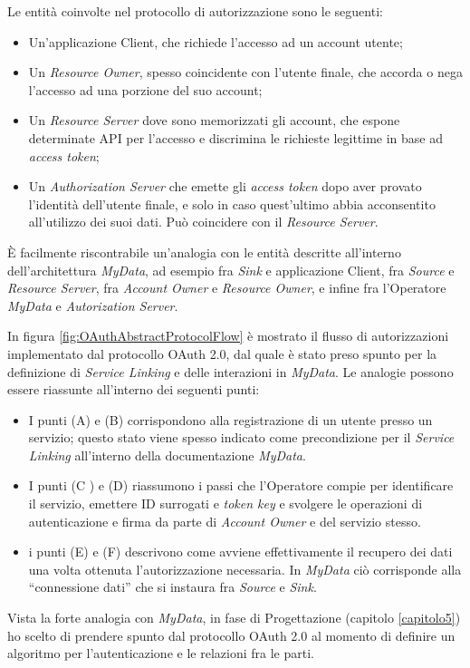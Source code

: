 Le entit\`a coinvolte nel protocollo di autorizzazione sono le seguenti:
\begin{itemize}
	\item Un’applicazione Client, che richiede l’accesso ad un account utente;
	\item Un \textit{Resource Owner}, spesso coincidente con l’utente finale, che accorda o nega l’accesso ad una porzione del suo account;
	\item Un \textit{Resource Server} dove sono memorizzati gli account, che espone determinate API per l’accesso e discrimina le richieste legittime in base ad \textit{access token};
	\item Un \textit{Authorization Server} che emette gli \textit{access token} dopo aver provato l’identit\`a dell’utente finale, e solo in caso quest’ultimo abbia acconsentito all’utilizzo dei suoi dati. Pu\`o coincidere con il \textit{Resource Server}.
\end{itemize}
\`E facilmente riscontrabile un’analogia con le entit\`a descritte all’interno dell’architettura \textit{MyData}, ad esempio fra \textit{Sink} e applicazione Client, fra \textit{Source} e \textit{Resource Server}, fra \textit{Account Owner} e \textit{Resource Owner}, e infine fra l’Operatore \textit{MyData} e \textit{Autorization Server}.

In figura \ref{fig:OAuthAbstractProtocolFlow} \`e mostrato il flusso di autorizzazioni implementato dal protocollo OAuth 2.0, dal quale \`e stato preso spunto per la definizione di \textit{Service Linking} e delle interazioni in \textit{MyData}. Le analogie possono essere riassunte all’interno dei seguenti punti:
\begin{itemize}
	\item I punti (A) e (B) corrispondono alla registrazione di un utente presso un servizio; questo stato viene spesso indicato come precondizione per il \textit{Service Linking} all’interno della documentazione \textit{MyData}.
	\item I punti (C ) e (D) riassumono i passi che l’Operatore compie per identificare il servizio, emettere ID surrogati e \textit{token key} e svolgere le operazioni di autenticazione e firma da parte di \textit{Account Owner} e del servizio stesso.
	\item i punti (E) e (F) descrivono come avviene effettivamente il recupero dei dati una volta ottenuta l’autorizzazione necessaria. In \textit{MyData} ci\`o corrisponde alla “connessione dati” che si instaura fra \textit{Source} e \textit{Sink}.
\end{itemize}
Vista la forte analogia con \textit{MyData}, in fase di Progettazione (capitolo \ref{capitolo5}) ho scelto di prendere spunto dal protocollo OAuth 2.0 al momento di definire un algoritmo per l’autenticazione e le relazioni fra le parti. 


